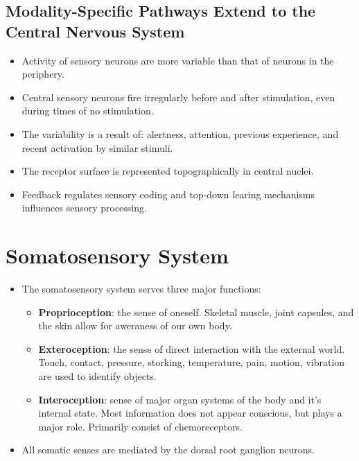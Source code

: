 \documentclass[12pt,a4paper]{article}
\begin{document}
\subsection{Modality-Specific Pathways Extend to the Central Nervous System}
\begin{itemize}
    \item Activity of sensory neurons are more variable than that of neurons in the periphery.
    \item Central sensory neurons fire irregularly before and after stimulation, even during times of no stimulation.
    \item The variability is a result of: alertness, attention, previous experience, and recent activation by similar stimuli.
    \item The receptor surface is represented topographically in central nuclei.
    \item Feedback regulates sensory coding and top-down learing mechanisms influences sensory processing.
\end{itemize}

\clearpage
\section{Somatosensory System}
\begin{itemize}
    \item The somatosensory system serves three major functions:
        \begin{itemize}
            \item \textbf{Proprioception}: the sense of oneself. Skeletal muscle, joint capsules, and the skin allow for aweraness of our own body.
            \item \textbf{Exteroception}: the sense of direct interaction with the external world. Touch, contact, pressure, storking, temperature, pain, motion, vibration are used to identify objects.
            \item \textbf{Interoception}: sense of major organ systems of the body and it's internal state. Most information does not appear conscious, but plays a major role. Primarily consist of chemoreceptors.
        \end{itemize}
    \item All somatic senses are mediated by the dorsal root ganglion neurons.
\end{itemize}
\end{document}
